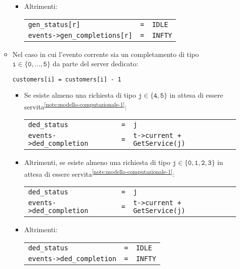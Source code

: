 \begin{enumerate}[label=Step \arabic*), align=left, leftmargin=*]
\begin{itemize}
\begin{itemize}
\item Altrimenti:
\begin{center}
\begin{tabular}{l l l}
\texttt{gen\_status[r]} & \texttt{=} & \texttt{IDLE} \\
\texttt{events->gen\_completions[r]} & \texttt{=} & \texttt{INFTY}
\end{tabular}
\end{center}
\end{itemize}
\item Nel caso in cui l'evento corrente sia un completamento di tipo $\mathtt{i \in \lbrace 0, \dots, 5 \rbrace}$ da parte del server dedicato:
\begin{center}
\texttt{customers[i] = customers[i] - 1}
\end{center}
\begin{itemize}
\item Se esiste almeno una richiesta di tipo $\mathtt{j \in \lbrace 4, 5 \rbrace}$ in attesa di essere servita\textsuperscript{\ref{note:modello-computazionale-1}}:
\begin{center}
\begin{tabular}{l l l}
\texttt{ded\_status} & \texttt{=} & \texttt{j} \\
\texttt{events->ded\_completion} & \texttt{=} & \texttt{t->current + GetService(j)}
\end{tabular}
\end{center}
\item Altrimenti, se esiste almeno una richiesta di tipo $\mathtt{j \in \lbrace 0, 1, 2, 3 \rbrace}$ in attesa di essere servita\textsuperscript{\ref{note:modello-computazionale-1}}:
\begin{center}
\begin{tabular}{l l l}
\texttt{ded\_status} & \texttt{=} & \texttt{j} \\
\texttt{events->ded\_completion} & \texttt{=} & \texttt{t->current + GetService(j)}
\end{tabular}
\end{center}
\item Altrimenti:
\begin{center}
\begin{tabular}{l l l}
\texttt{ded\_status} & \texttt{=} & \texttt{IDLE} \\
\texttt{events->ded\_completion} & \texttt{=} & \texttt{INFTY}
\end{tabular}
\end{center}
\end{itemize}

\end{itemize}
\end{enumerate}
